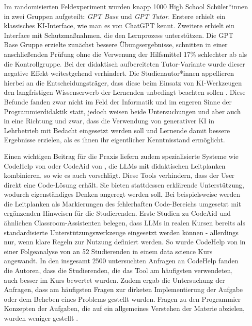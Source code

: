 Im randomisierten Feldexperiment wurden knapp 1000 High School Schüler*innen in zwei Gruppen aufgeteilt: \textit{GPT Base} und \textit{GPT Tutor}. Erstere erhielt ein klassisches KI-Interface, wie man es von ChatGPT kennt. Zweitere erhielt ein Interface mit Schutzmaßnahmen, die den Lernprozess unterstützen. Die GPT Base Gruppe erzielte zunächst bessere Übungsergebnisse, schnitten in einer anschließenden Prüfung ohne die Verwenung der Hilfsmittel 17\% schlechter ab als die Kontrollgruppe. Bei der didaktisch aufbereiteten Tutor-Variante wurde dieser negative Effekt weitestgehend verhindert. Die Studienautor*innen appellieren hierbei an die Entscheidungsträger, dass diese beim Einsatz von KI-Werkzeugen den langfristigen Wissenserwerb der Lernenden unbedingt beachten sollen \parencite[S.~1]{bastani_generative_2025}. Diese Befunde fanden zwar nicht im Feld der Informatik und im engeren Sinne der Programmierdidaktik statt, jedoch weisen beide Untersuchungen \textcite{fan_beware_2025} und \textcite{bastani_generative_2025} aber auch \textcite{prather_widening_2024} in eine Richtung und zwar, dass die Verwendung von generativer KI in Lehrbetrieb mit Bedacht eingesetzt werden soll und Lernende damit bessere Ergebnisse erzielen, als es ihnen ihr eigentlicher Kenntnisstand ermöglicht.

Einen wichtigen Beitrag für die Praxis liefern zudem spezialisierte Systeme wie CodeHelp von \textcite[S.~1]{CodeHelp} oder CodeAid von \textcite[S.~3]{KazemitabaarCodeAid}, die LLMs mit didaktischen Leitplanken kombinieren, so wie es auch \textcite[S.~1]{bastani_generative_2025} vorschlägt. Diese Tools verhindern, dass der User direkt eine Code-Lösung erhält. Sie bieten stattdessen erklärende Unterstützung, wodurch eigenständiges Denken angeregt werden soll. Bei \textcite[S.~9]{KazemitabaarCodeAid} beispielsweise werden die Leitplanken als Markierungen des fehlerhaften Code-Bereichs umgesetzt mit ergänzenden Hinweisen für die Studierenden. Erste Studien zu CodeAid und ähnlichen Classroom-Assistenten belegen, dass LLMs in realen Kursen bereits als standardisierte Unterstützungswerkzeuge eingesetzt werden können - allerdings nur, wenn klare Regeln zur Nutzung definiert werden. So wurde CodeHelp von \textcite{CodeHelp} in einer Folgeanalyse von \textcite[S.~1]{sheese_patterns_2024} an 52 Studierenden in einem data science Kurs angewandt. In den insgesamt 2500 untersuchten Anfragen an CodeHelp fanden die Autoren, dass die Studierenden, die das Tool am häufigsten verwendeten, auch besser im Kurs bewertet wurden. Zudem ergab die Untersuchung der Anfragen, dass am häufigsten Fragen zur dirketen Implementierung der Aufgabe oder dem Beheben eines Problems gestellt wurden. Fragen zu den Programmier-Konzepten der Aufgaben, die auf ein allgemeines Verstehen der Materie abzielen, wurden weniger gestellt \parencite[S.~54]{sheese_patterns_2024}.

